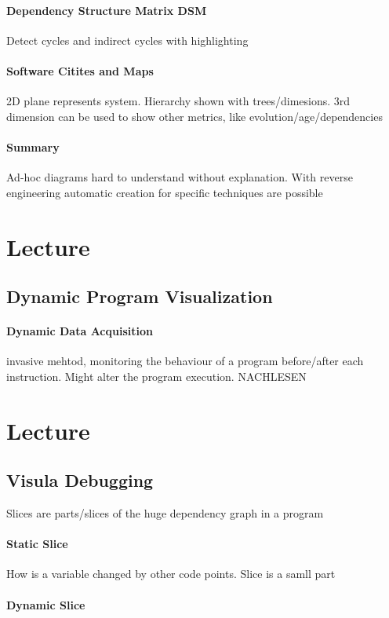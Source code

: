 \documentclass[ngerman]{scrartcl}
\begin{document}
\paragraph{Dependency Structure Matrix DSM}
Detect cycles and indirect cycles with highlighting
\paragraph{Software Citites and Maps}
2D plane represents system. Hierarchy shown with trees/dimesions. 3rd dimension can be used to show other metrics, like evolution/age/dependencies
\paragraph{Summary}
Ad-hoc diagrams hard to understand without explanation. With reverse engineering automatic creation for specific techniques are possible	 

\section{Lecture}
\subsection{Dynamic Program Visualization}

\paragraph{Dynamic Data Acquisition} invasive mehtod, monitoring the behaviour of a program before/after each instruction. Might alter the program execution. 
NACHLESEN

\section{Lecture}
\subsection{Visula Debugging}
Slices are parts/slices of the huge dependency graph in a program 
\paragraph{Static Slice} How is a variable changed by other code points. Slice is a samll part
\paragraph{Dynamic Slice} 
\end{document}
